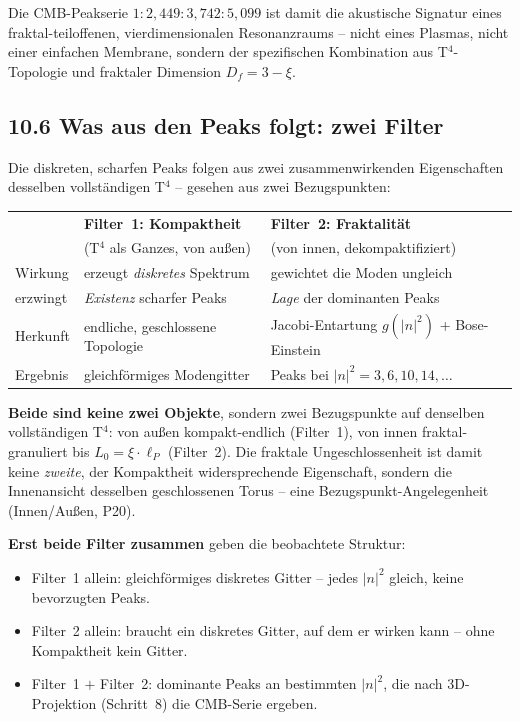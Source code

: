 Die CMB-Peakserie $1:2{,}449:3{,}742:5{,}099$ ist damit die
akustische Signatur eines fraktal-teiloffenen, vierdimensionalen
Resonanzraums -- nicht eines Plasmas, nicht einer einfachen Membrane,
sondern der spezifischen Kombination aus T$^4$-Topologie und
fraktaler Dimension $D_f = 3 - \xi$.

\subsection*{10.6 Was aus den Peaks folgt: zwei Filter}

Die diskreten, scharfen Peaks folgen aus zwei zusammenwirkenden
Eigenschaften desselben vollständigen T$^4$ -- gesehen aus zwei
Bezugspunkten:

\begin{center}
\begin{tabular}{p{2.2cm}p{4.6cm}p{4.6cm}}
\toprule
 & \textbf{Filter~1: Kompaktheit} & \textbf{Filter~2: Fraktalität} \\
 & (T$^4$ als Ganzes, von außen) & (von innen, dekompaktifiziert) \\
\midrule
Wirkung & erzeugt \emph{diskretes} Spektrum &
  gewichtet die Moden ungleich \\
\addlinespace
erzwingt & \emph{Existenz} scharfer Peaks &
  \emph{Lage} der dominanten Peaks \\
\addlinespace
Herkunft & endliche, geschlossene Topologie &
  Jacobi-Entartung $g(|n|^2)$ + Bose-Einstein \\
\addlinespace
Ergebnis & gleichförmiges Modengitter &
  Peaks bei $|n|^2 = 3, 6, 10, 14, \ldots$ \\
\bottomrule
\end{tabular}
\end{center}

\textbf{Beide sind keine zwei Objekte}, sondern zwei Bezugspunkte auf
denselben vollständigen T$^4$: von außen kompakt-endlich (Filter~1),
von innen fraktal-granuliert bis $L_0 = \xi\cdot\ell_P$ (Filter~2).
Die fraktale Ungeschlossenheit ist damit keine \emph{zweite}, der
Kompaktheit widersprechende Eigenschaft, sondern die Innenansicht
desselben geschlossenen Torus -- eine Bezugspunkt-Angelegenheit
(Innen/Außen, P20).

\textbf{Erst beide Filter zusammen} geben die beobachtete Struktur:
\begin{itemize}
  \item Filter~1 allein: gleichförmiges diskretes Gitter -- jedes
        $|n|^2$ gleich, keine bevorzugten Peaks.
  \item Filter~2 allein: braucht ein diskretes Gitter, auf dem er
        wirken kann -- ohne Kompaktheit kein Gitter.
  \item Filter~1 $+$ Filter~2: dominante Peaks an bestimmten $|n|^2$,
        die nach 3D-Projektion (Schritt~8) die CMB-Serie ergeben.
\end{itemize}

